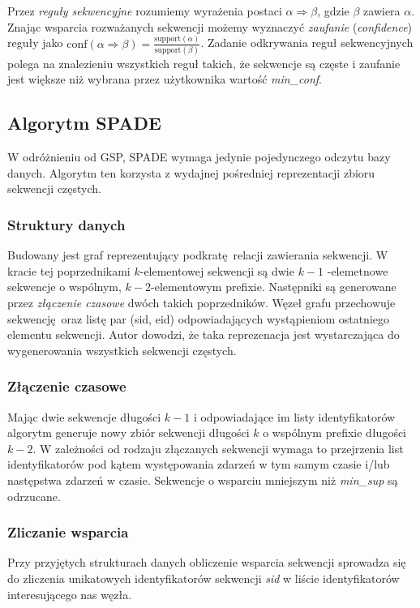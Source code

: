 \documentclass[paper=a4, fontsize=11pt]{scrartcl} %
\numberwithin{equation}{section} %
\numberwithin{figure}{section} %
\numberwithin{table}{section} %
\begin{document}
Przez {\em reguły sekwencyjne} rozumiemy wyrażenia postaci \( \alpha
\Rightarrow \beta \), gdzie \(\beta \) zawiera \( \alpha \).  Znając wsparcia
rozważanych sekwencji możemy wyznaczyć {\em zaufanie} ({\em confidence})
reguły jako \( \text{conf}(\alpha \Rightarrow \beta) = \frac{\text{support}(\alpha)}{\text{support}(\beta)}\).
Zadanie odkrywania reguł sekwencyjnych polega na znalezieniu wszystkich reguł
takich, że sekwencje są częste i zaufanie jest większe niż wybrana przez
użytkownika wartość {\em min\_conf}.

\subsection{Algorytm SPADE}
W odróżnieniu od GSP, SPADE wymaga jedynie pojedynczego odczytu bazy danych.
Algorytm ten korzysta z wydajnej pośredniej reprezentacji zbioru sekwencji
częstych.

\subsubsection{Struktury danych}
Budowany jest graf reprezentujący podkratę relacji zawierania sekwencji.  W
kracie tej poprzednikami \( k \)-elementowej sekwencji są dwie \( k-1 \)
-elemetnowe sekwencje o wspólnym, \( k-2 \)-elementowym prefixie.  Następniki
są generowane przez {\em złączenie czasowe} dwóch takich poprzedników.  Węzeł
grafu przechowuje sekwencję oraz listę par (sid, eid) odpowiadających
wystąpieniom ostatniego elementu sekwencji.  Autor dowodzi, że taka
reprezenacja jest wystarczająca do wygenerowania wszystkich sekwencji częstych.

\subsubsection{Złączenie czasowe}
Mając dwie sekwencje długości \( k-1 \) i odpowiadające im listy
identyfikatorów algorytm generuje nowy zbiór sekwencji długości \( k \)
o wspólnym prefixie długości \( k-2 \).  W zależności od rodzaju złączanych
sekwencji wymaga to przejrzenia list identyfikatorów pod kątem występowania
zdarzeń w tym samym czasie i/lub następstwa zdarzeń w czasie.  Sekwencje
o wsparciu mniejszym niż {\em min\_sup} są odrzucane.

\subsubsection{Zliczanie wsparcia}
Przy przyjętych strukturach danych obliczenie wsparcia sekwencji sprowadza się
do zliczenia unikatowych identyfikatorów sekwencji {\em sid} w liście
identyfikatorów interesującego nas węzła.
\end{document}
